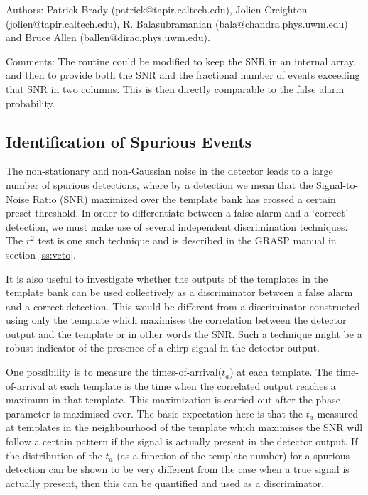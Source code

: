 \begin{description}
\item{Authors:} Patrick Brady (patrick@tapir.caltech.edu),
   Jolien Creighton (jolien@tapir.caltech.edu), R. Balasubramanian (bala@chandra.phys.uwm.edu)
and Bruce Allen (ballen@dirac.phys.uwm.edu).
\item{Comments:}  The routine could be modified to keep the SNR in an
internal array,  and then to provide both the SNR and the fractional
number of events exceeding that SNR in two columns.  This is then
directly comparable to the false alarm probability.  
\end{description}

\clearpage
\subsection{Identification of Spurious Events}
\label{globaldiscriminators}

The non-stationary and non-Gaussian noise in the detector leads to a
large number of spurious detections, where by a detection we mean that
the Signal-to-Noise Ratio (SNR) maximized over the template bank 
has crossed a certain preset threshold. In order to differentiate
between a false alarm and a `correct' detection, we must make use of 
several independent discrimination  techniques. The $r^2$ test is one such
technique and is described in the GRASP manual in section \ref{ss:veto}. 

It is also useful to investigate whether the outputs of the 
templates in the template bank can be used collectively as a discriminator
between a false alarm and a correct detection. This would be different
from a discriminator constructed using only the template which maximises
the correlation between the detector output and the template or in
other words the SNR. Such a technique might be
a robust indicator of the presence of a chirp signal in the detector
output.

One possibility is to measure the times-of-arrival($t_a$) at each template. The
time-of-arrival at each template is the time when the correlated
output reaches a maximum in that template. This maximization is
carried out after the phase parameter is maximised over. 
The basic expectation here is that the $t_a$ measured at  templates in the
neighbourhood of the template which maximises the SNR will follow a
certain pattern if the signal is actually present in the detector
output. If the distribution of the $t_a$ (as a function of the template
number) for a spurious detection
can be shown to
be very different from the case when a true signal is actually present,
then this can be quantified and used as a discriminator.

